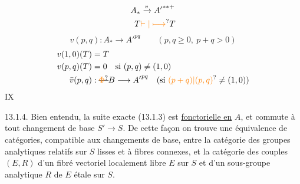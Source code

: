 \[
 \begin{aligned}
 A_*&\xrightarrow{v}{A'}^{**+}\\
 T&\unsure{\vdash|\longmapsto} T
 \end{aligned}
\]
\[
 v(p,q): A_*\longrightarrow {A'}^{pq}\qquad(p,q\geq0,\ p+q>0)
\]
\[
 \begin{aligned}
 v(1,0)(T)&=T\\
 v(p,q)(T)&=0\quad\text{si }(p,q)\ne(1,0)\\
 \bar v(p,q)&:\deleted{\unsure{\Phi}}B\longrightarrow {A'}^{pq}\quad(\text{si }\unsure{(p+q)|(p,q)}\ne(1,0))
 \end{aligned}
\]
\hfill IX

13.1.4. Bien entendu, la suite exacte (13.1.3) est \uline{fonctorielle en} $A$, et commute à tout changement de base $S'\longrightarrow S$. De cette façon on trouve une équivalence de catégories, compatible aux changements de base, entre la catégorie des groupes analytiques relatifs sur $S$ lisses et à fibres connexes, et la catégorie des couples $(E,R)$ d'un fibré vectoriel localement libre $E$ sur $S$ et d'un sous-groupe analytique $R$ de $E$ étale sur $S$.

